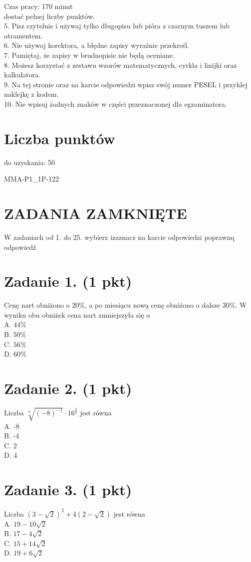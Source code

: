 \documentclass[10pt]{article}
\begin{document}
Czas pracy: 170 minut\\
dostać pełnej liczby punktów.\\
5. Pisz czytelnie i używaj tylko długopisu lub pióra z czarnym tuszem lub atramentem.\\
6. Nie używaj korektora, a błędne zapisy wyraźnie przekreśl.\\
7. Pamiętaj, że zapisy w brudnopisie nie będą oceniane.\\
8. Możesz korzystać z zestawu wzorów matematycznych, cyrkla i linijki oraz kalkulatora.\\
9. Na tej stronie oraz na karcie odpowiedzi wpisz swój numer PESEL i przyklej naklejkę z kodem.\\
10. Nie wpisuj żadnych znaków w części przeznaczonej dla egzaminatora.

\section*{Liczba punktów}
do uzyskania: 50

MMA-P1\_1P-122

\section*{ZADANIA ZAMKNIĘTE}
W zadaniach od 1. do 25. wybierz izaznacz na karcie odpowiedzi poprawnq odpowiedź.

\section*{Zadanie 1. (1 pkt)}
Cenę nart obniżono o \(20 \%\), a po miesiącu nową cenę obniżono o dalsze \(30 \%\). W wyniku obu obniżek cena nart zmniejszyła się o\\
A. \(44 \%\)\\
B. \(50 \%\)\\
C. \(56 \%\)\\
D. \(60 \%\)

\section*{Zadanie 2. (1 pkt)}
Liczba \(\sqrt[3]{(-8)^{-1}} \cdot 16^{\frac{3}{4}}\) jest równa\\
A. -8\\
B. -4\\
C. 2\\
D. 4

\section*{Zadanie 3. (1 pkt)}
Liczba \((3-\sqrt{2})^{2}+4(2-\sqrt{2})\) jest równa\\
A. \(19-10 \sqrt{2}\)\\
B. \(17-4 \sqrt{2}\)\\
C. \(15+14 \sqrt{2}\)\\
D. \(19+6 \sqrt{2}\)
\end{document}
